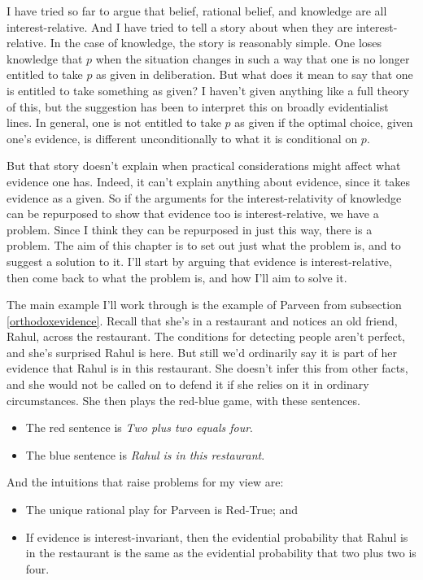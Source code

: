\documentclass[11pt,]{book}
\providecommand{\tightlist}{%
  \setlength{\itemsep}{0pt}\setlength{\parskip}{0pt}}
\begin{document}
I have tried so far to argue that belief, rational belief, and knowledge are all interest-relative. And I have tried to tell a story about when they are interest-relative. In the case of knowledge, the story is reasonably simple. One loses knowledge that \(p\) when the situation changes in such a way that one is no longer entitled to take \(p\) as given in deliberation. But what does it mean to say that one is entitled to take something as given? I haven't given anything like a full theory of this, but the suggestion has been to interpret this on broadly evidentialist lines. In general, one is not entitled to take \(p\) as given if the optimal choice, given one's evidence, is different unconditionally to what it is conditional on \(p\).

But that story doesn't explain when practical considerations might affect what evidence one has. Indeed, it can't explain anything about evidence, since it takes evidence as a given. So if the arguments for the interest-relativity of knowledge can be repurposed to show that evidence too is interest-relative, we have a problem. Since I think they can be repurposed in just this way, there is a problem. The aim of this chapter is to set out just what the problem is, and to suggest a solution to it. I'll start by arguing that evidence is interest-relative, then come back to what the problem is, and how I'll aim to solve it.

The main example I'll work through is the example of Parveen from subsection \ref{orthodoxevidence}. Recall that she's in a restaurant and notices an old friend, Rahul, across the restaurant. The conditions for detecting people aren't perfect, and she's surprised Rahul is here. But still we'd ordinarily say it is part of her evidence that Rahul is in this restaurant. She doesn't infer this from other facts, and she would not be called on to defend it if she relies on it in ordinary circumstances. She then plays the red-blue game, with these sentences.

\begin{itemize}
\tightlist
\item
  The red sentence is \emph{Two plus two equals four}.
\item
  The blue sentence is \emph{Rahul is in this restaurant}.
\end{itemize}

And the intuitions that raise problems for my view are:

\begin{itemize}
\tightlist
\item
  The unique rational play for Parveen is Red-True; and
\item
  If evidence is interest-invariant, then the evidential probability that Rahul is in the restaurant is the same as the evidential probability that two plus two is four.
\end{itemize}
\end{document}
